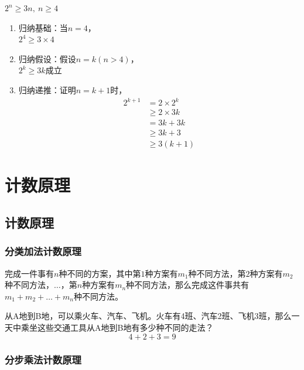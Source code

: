 \documentclass[12pt, openany, oneside]{book}
\begin{document}
\begin{tcolorbox}\nonumber
	$ 2^n \ge 3n,\ n \ge 4 $
	\begin{enumerate}
		\item 归纳基础：当$ n = 4 $，\\
		      $ 2^4 \ge 3 \times 4 $

		\item 归纳假设：假设$ n = k (n > 4) $， \\
		      $ 2^k \ge 3k $成立

		\item 归纳递推：证明$ n = k + 1 $时，
		      \begin{align}
			      2^{k+1} & = 2 \times 2^k  \\
			              & \ge 2 \times 3k \\
			              & = 3k + 3k       \\
			              & \ge 3k + 3      \\
			              & \ge 3(k+1)
		      \end{align}
	\end{enumerate}
\end{tcolorbox}

\newpage

\chapter{计数原理}

\section{计数原理}

\subsection{分类加法计数原理}

完成一件事有$ n $种不同的方案，其中第$ 1 $种方案有$ m_1 $种不同方法，第$ 2 $种方案有$ m_2 $种不同方法，$ \dots $，第$ n $种方案有$ m_n $种不同方法，那么完成这件事共有$ m_1 + m_2 + \dots + m_n $种不同方法。

\begin{tcolorbox}
	从A地到B地，可以乘火车、汽车、飞机。火车有4班、汽车2班、飞机3班，那么一天中乘坐这些交通工具从A地到B地有多少种不同的走法？
	$$
		4 + 2 + 3 = 9
	$$
\end{tcolorbox}

\subsection{分步乘法计数原理}
\end{document}
